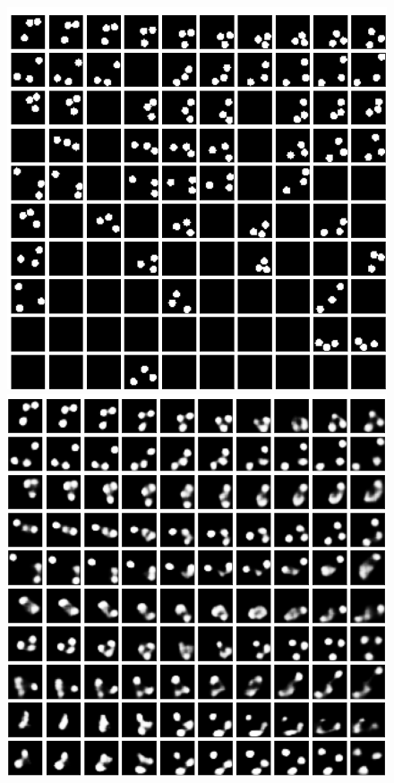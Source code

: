 \documentclass[12pt]{article}
\begin{document}
\begin{figure}[h!]
	\begin{minipage}{0.32\textwidth}
		\includegraphics[scale=0.22]{bouncingBalls_VAE}
	\end{minipage}
	\begin{minipage}{0.32\textwidth}
		\includegraphics[scale=0.22]{bouncingBalls_VAElat}

\end{minipage}
\end{figure}
\end{document}
